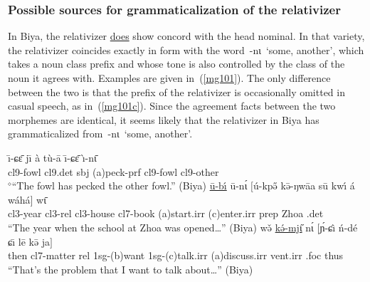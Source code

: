 \documentclass[10pt,twoside]{article}
\makeatletter
\def\ci#1{{\ipaFont #1}}
\newcommand{\gl}[1]{`#1'}
\newcommand{\cl}[1]{{\sc cl#1}}
\def\elicited{$^\diamond$}
\def\til{\raise.17ex\hbox{$\scriptstyle\mathtt{\sim}$}}	%
\def\ML#1{#1\symbol{"1DC6}} %
\renewcommand{\i}{ı}
\def\@{ə}
\def\eh{ɛ}
\def\ih{ɩ}
\def\ng{ŋ}
\def\ny{ɲ}
\def\sh{ɕ}
\makeatother
\begin{document}
\subsubsection{Possible sources for grammaticalization of the relativizer}
%
In Biya, the relativizer \uline{does} show concord with the head nominal. 
In that variety, the relativizer coincides exactly in form with the word~\ci{-n\ih}~\gl{some, another},
which takes a noun class prefix and whose tone is also controlled by the
class of the noun it agrees with.\footnotemark\/ 
Examples are given in~(\ref{mg101}). The only difference between the two
is that the prefix of the relativizer is occasionally omitted in casual
speech, as in~(\ref{mg101c}).%
 Since the agreement
facts between the two morphemes are identical, it seems likely that
the relativizer in Biya has grammaticalized from~\ci{-n\ih}~\gl{some, another}.
%
\begin{exe}
\ex \label{mg101}
\begin{xlist}
\ex
\gll \=\i-\sh\={\eh} j\={\i} \`a t\`u-\=a \={\i}-\sh{\=\eh} \`\i-n\={\ih}	\\
\cl9-fowl \cl9.{\sc det} {\sc sbj} ({\sc a})peck-{\sc prf} \cl9-fowl \cl9-other	\\
\glt \elicited``The fowl has pecked the other fowl.'' (Biya)
\ex
\gll \uline{\=u-b\'{\i}} \=u-n\'{\ih} $[$\'u-kp\H{\@} k\={\@}-\ng{w\={a}{a}} s\=u kw\'{\i} \'a w\'ah\'a$]$ w\={\ih}	\\
\cl3-year \cl3-{\sc rel} \cl3-house \cl7-book ({\sc a})start.{\sc irr} ({\sc c})enter.{\sc irr} {\sc prep} Zhoa {\sc \cl3.det}	\\
\glt ``The year when the school at Zhoa was opened\dots'' (Biya)
\ex \label{mg101c}
\gll w\v{\@} \uline{k\'{\@}-mj\H{\ih}} n\'{\ih} $[$\'\ny-\sh\^{\i} \'n-d\'e \sh\={\i} l\={e} k\={\@} j\ML{a}$]$	\\
then \cl7-matter {\sc rel} 1sg-({\sc b})want 1sg-({\sc c})talk.{\sc irr} ({\sc a})discuss.{\sc irr} {\sc vent.irr} {\sc \cl7.foc} thus	\\
\glt ``That's the problem that I want to talk about\dots'' (Biya)
\end{xlist}
\end{exe}
\end{document}
